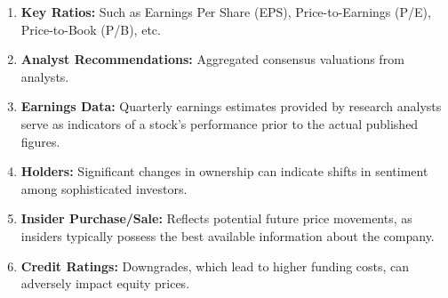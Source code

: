 \begin{definition} 
\begin{enumerate}[label=\roman*.]
\setlength{\itemsep}{0pt}
\item \textbf{Key Ratios:} Such as Earnings Per Share (EPS), Price-to-Earnings (P/E), Price-to-Book (P/B), etc.
\item \textbf{Analyst Recommendations:} Aggregated consensus valuations from analysts.
\item \textbf{Earnings Data:} Quarterly earnings estimates provided by research analysts serve as indicators of a stock's performance prior to the actual published figures.
\item \textbf{Holders:} Significant changes in ownership can indicate shifts in sentiment among sophisticated investors.
\item \textbf{Insider Purchase/Sale:} Reflects potential future price movements, as insiders typically possess the best available information about the company.
\item \textbf{Credit Ratings:} Downgrades, which lead to higher funding costs, can adversely impact equity prices.
\end{enumerate}
\end{definition}
